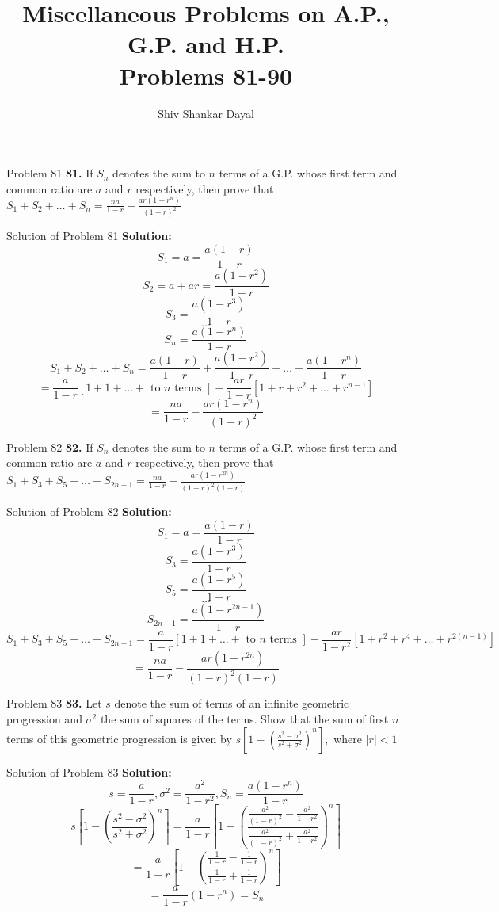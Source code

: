 \documentclass[aspectratio=1610,8pt]{beamer}
\title{Miscellaneous Problems on A.P., G.P. and H.P.\\Problems 81-90}
\author[Shiv Shankar Dayal]{Shiv Shankar Dayal}
\begin{document}
\begin{frame}
  \titlepage
\end{frame}
\begin{frame}{Problem 81}
  \textbf{81.} If $S_n$ denotes the sum to $n$ terms of a G.P. whose first term and common ratio are $a$ and $r$ respectively, then
  prove that $S_1 + S_2 + \ldots + S_n = \frac{na}{1 - r} - \frac{ar(1 - r^n)}{(1 - r)^2}$
\end{frame}
\begin{frame}{Solution of Problem 81}
  \textbf{Solution:}$$S_1 = a = \frac{a(1 - r)}{1 - r}$$
  $$S_2 = a + ar = \frac{a(1 - r^2)}{1 - r}$$
  $$S_3 = \frac{a(1 - r^3)}{1 - r}$$
  $$\ldots$$
  $$S_n = \frac{a(1 - r^n)}{1 - r}$$
  $$S_1 + S_2 + \ldots + S_n = \frac{a(1 - r)}{1 - r} + \frac{a(1 - r^2)}{1 - r} + \ldots + \frac{a(1 - r^n)}{1 - r}$$
  $$= \frac{a}{1 - r}[1 + 1 + \ldots + \text{~to~}n\text{~terms~}] - \frac{ar}{1 - r}[1 + r + r^2 + \ldots + r^{n - 1}]$$
  $$= \frac{na}{1 - r} - \frac{ar(1 - r^n)}{(1 - r)^2}$$
\end{frame}
\begin{frame}{Problem 82}
  \textbf{82.} If $S_n$ denotes the sum to $n$ terms of a G.P. whose first term and common ratio are $a$ and $r$ respectively, then
  prove that $S_1 + S_3 + S_5 + \ldots + S_{2n - 1} = \frac{na}{1 - r} - \frac{ar(1 - r^{2n})}{(1 - r)^2(1 + r)}$
\end{frame}
\begin{frame}{Solution of Problem 82}
  \textbf{Solution:} $$S_1 = a = \frac{a(1 - r)}{1 - r}$$
  $$S_3 = \frac{a(1 - r^3)}{1 - r}$$
  $$S_5 = \frac{a(1 - r^5)}{1 - r}$$
  $$\ldots$$
  $$S_{2n - 1} = \frac{a(1 - r^{2n - 1})}{1 - r}$$
  $$S_1 + S_3 + S_5 + \ldots + S_{2n - 1} = \frac{a}{1 - r}[1 + 1 + \ldots + \text{~to~}n\text{~terms~}] - \frac{ar}{1 - r^2}[1 +
    r^2 + r^4 + \ldots + r^{2(n - 1)}]$$
  $$= \frac{na}{1 - r} - \frac{ar(1 - r^{2n})}{(1 - r)^2(1 + r)}$$
\end{frame}
\begin{frame}{Problem 83}
  \textbf{83.} Let $s$ denote the sum of terms of an infinite geometric progression and $\sigma^2$ the sum of squares of the
  terms. Show that the sum of first $n$ terms of this geometric progression is given by $s\left[1 - \left(\frac{s^2 - \sigma^2}{s^2
      + \sigma^2}\right)^n\right],$ where $|r| < 1$
\end{frame}
\begin{frame}{Solution of Problem 83}
  \textbf{Solution:} $$s = \frac{a}{1 - r}, \sigma^2 = \frac{a^2}{1 - r^2}, S_n = \frac{a(1 - r^n)}{1 - r}$$
  $$s\left[1 - \left(\frac{s^2 - \sigma^2}{s^2 + \sigma^2}\right)^n\right] = \frac{a}{1 - r}\left[1 - \left(\frac{\frac{a^2}{(1 -
        r)^2} - \frac{a^2}{1 - r^2}}{\frac{a^2}{(1 - r)^2} + \frac{a^2}{1 - r^2}}\right)^n\right]$$
  $$= \frac{a}{1 - r}\left[1 - \left(\frac{\frac{1}{1 - r} - \frac{1}{1 + r}}{\frac{1}{1 - r} + \frac{1}{1 + r}}\right)^n\right]$$
  $$= \frac{a}{1 - r}(1 - r^n) = S_n$$
\end{frame}
\end{document}
